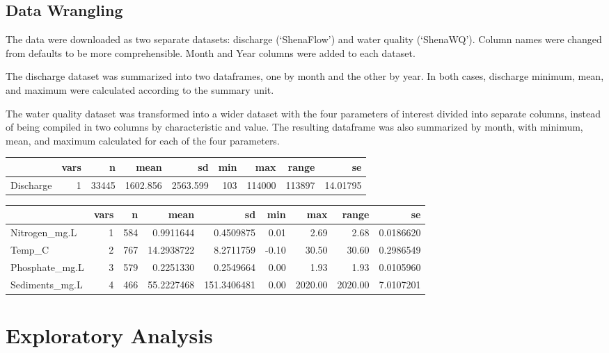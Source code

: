 \documentclass[
  12pt,
]{article}
\begin{document}
\hypertarget{data-wrangling}{%
\subsection{Data Wrangling}\label{data-wrangling}}

The data were downloaded as two separate datasets: discharge
(`ShenaFlow') and water quality (`ShenaWQ'). Column names were changed
from defaults to be more comprehensible. Month and Year columns were
added to each dataset.

The discharge dataset was summarized into two dataframes, one by month
and the other by year. In both cases, discharge minimum, mean, and
maximum were calculated according to the summary unit.

The water quality dataset was transformed into a wider dataset with the
four parameters of interest divided into separate columns, instead of
being compiled in two columns by characteristic and value. The resulting
dataframe was also summarized by month, with minimum, mean, and maximum
calculated for each of the four parameters.

\begin{longtable}[]{@{}lrrrrrrrr@{}}
\toprule
& vars & n & mean & sd & min & max & range & se \\
\midrule
\endhead
Discharge & 1 & 33445 & 1602.856 & 2563.599 & 103 & 114000 & 113897 &
14.01795 \\
\bottomrule
\end{longtable}

\begin{longtable}[]{@{}lrrrrrrrr@{}}
\toprule
& vars & n & mean & sd & min & max & range & se \\
\midrule
\endhead
Nitrogen\_mg.L & 1 & 584 & 0.9911644 & 0.4509875 & 0.01 & 2.69 & 2.68 &
0.0186620 \\
Temp\_C & 2 & 767 & 14.2938722 & 8.2711759 & -0.10 & 30.50 & 30.60 &
0.2986549 \\
Phosphate\_mg.L & 3 & 579 & 0.2251330 & 0.2549664 & 0.00 & 1.93 & 1.93 &
0.0105960 \\
Sediments\_mg.L & 4 & 466 & 55.2227468 & 151.3406481 & 0.00 & 2020.00 &
2020.00 & 7.0107201 \\
\bottomrule
\end{longtable}

\newpage

\hypertarget{exploratory-analysis}{%
\section{Exploratory Analysis}\label{exploratory-analysis}}
\end{document}
